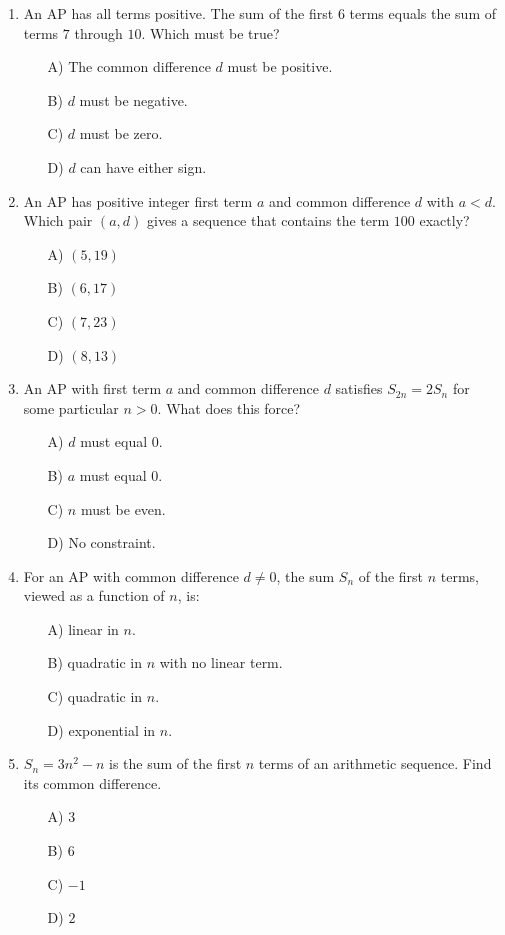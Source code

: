 \documentclass[11pt,a4paper]{article}
\begin{document}
\begin{enumerate}
\item An AP has all terms positive. The sum of the first $6$ terms equals the sum of terms $7$ through $10$. Which must be true?
\begin{itemize}
\item[A)] The common difference $d$ must be positive.
\item[B)] $d$ must be negative.
\item[C)] $d$ must be zero.
\item[D)] $d$ can have either sign.
\end{itemize}

\item An AP has positive integer first term $a$ and common difference $d$ with $a<d$. Which pair $(a,d)$ gives a sequence that contains the term $100$ exactly?
\begin{itemize}
\item[A)] $(5,19)$
\item[B)] $(6,17)$
\item[C)] $(7,23)$
\item[D)] $(8,13)$
\end{itemize}

\item An AP with first term $a$ and common difference $d$ satisfies $S_{2n}=2S_n$ for some particular $n>0$. What does this force?
\begin{itemize}
\item[A)] $d$ must equal $0$.
\item[B)] $a$ must equal $0$.
\item[C)] $n$ must be even.
\item[D)] No constraint.
\end{itemize}

\item For an AP with common difference $d\neq0$, the sum $S_n$ of the first $n$ terms, viewed as a function of $n$, is:
\begin{itemize}
\item[A)] linear in $n$.
\item[B)] quadratic in $n$ with no linear term.
\item[C)] quadratic in $n$.
\item[D)] exponential in $n$.
\end{itemize}

\item $S_n=3n^2-n$ is the sum of the first $n$ terms of an arithmetic sequence. Find its common difference.
\begin{itemize}
\item[A)] $3$
\item[B)] $6$
\item[C)] $-1$
\item[D)] $2$
\end{itemize}

\end{enumerate}
\end{document}
